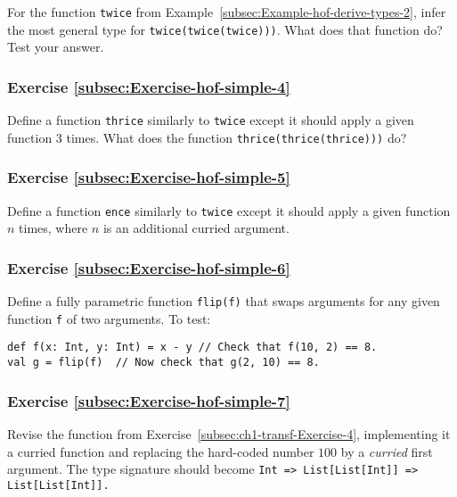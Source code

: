 For the function \lstinline!twice! from Example~\ref{subsec:Example-hof-derive-types-2},
infer the most general type for \lstinline!twice(twice(twice)))!.
What does that function do? Test your answer.

\subsubsection{Exercise \label{subsec:Exercise-hof-simple-4}\ref{subsec:Exercise-hof-simple-4}}

Define a function \lstinline!thrice! similarly to \lstinline!twice!
except it should apply a given function $3$ times. What does the
function \lstinline!thrice(thrice(thrice)))! do?

\subsubsection{Exercise \label{subsec:Exercise-hof-simple-5}\ref{subsec:Exercise-hof-simple-5}}

Define a function \lstinline!ence! similarly to \lstinline!twice!
except it should apply a given function $n$ times, where $n$ is
an additional curried argument.

\subsubsection{Exercise \label{subsec:Exercise-hof-simple-6}\ref{subsec:Exercise-hof-simple-6}}

Define a fully parametric function \lstinline!flip(f)! that swaps
arguments for any given function \lstinline!f! of two arguments.
To test: 

\begin{lstlisting}
def f(x: Int, y: Int) = x - y // Check that f(10, 2) == 8.
val g = flip(f)  // Now check that g(2, 10) == 8.
\end{lstlisting}


\subsubsection{Exercise \label{subsec:Exercise-hof-simple-7}\ref{subsec:Exercise-hof-simple-7}}

Revise the function from Exercise~\ref{subsec:ch1-transf-Exercise-4},
implementing it a curried function and replacing the hard-coded number
$100$ by a \emph{curried} first argument. The type signature should
become \texttt{}\lstinline!Int => List[List[Int]] => List[List[Int]]!\texttt{.}

